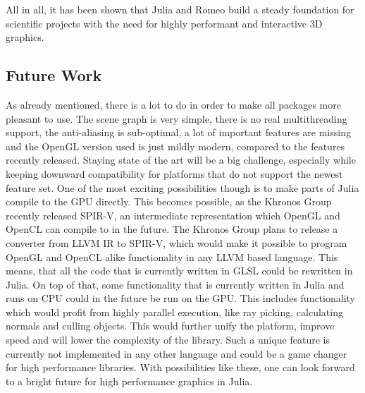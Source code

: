 All in all, it has been shown that Julia and Romeo build a steady foundation for scientific projects with the need for highly performant and interactive 3D graphics.

\subsection{Future Work}

As already mentioned, there is a lot to do in order to make all packages more pleasant to use.
The scene graph is very simple, there is no real multithreading support, the anti-aliasing is sub-optimal, a lot of important features are missing and the OpenGL version used is just mildly modern, compared to the features recently released. 
Staying state of the art will be a big challenge, especially while keeping downward compatibility for platforms that do not support the newest feature set.
One of the most exciting possibilities though is to make parts of Julia compile to the GPU directly. 
This becomes possible, as the Khronos Group recently released \ac{SPIR-V}, an intermediate representation which \ac{OpenGL} and \ac{OpenCL} can compile to in the future. The Khronos Group plans to release a converter from \ac{LLVM} \ac{IR} to \ac{SPIR-V}, which would make it possible to program \ac{OpenGL} and \ac{OpenCL} alike functionality in any \ac{LLVM} based language\cite{SpirV}.
This means, that all the code that is currently written in \ac{GLSL} could be rewritten in Julia. 
On top of that, some functionality that is currently written in Julia and runs on \ac{CPU} could in the future be run on the \ac{GPU}. This includes functionality which would profit from highly parallel execution, like ray picking, calculating normals and culling objects.
This would further unify the platform, improve speed and will lower the complexity of the library. 
Such a unique feature is currently not implemented in any other language and could be a game changer for high performance libraries.
With possibilities like these, one can look forward to a bright future for high performance graphics in Julia.
